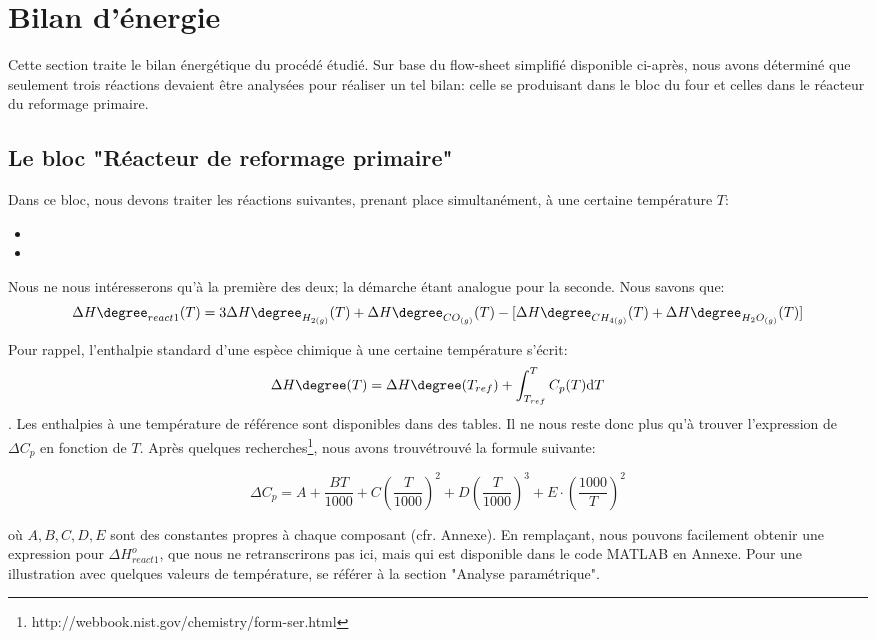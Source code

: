 \documentclass[11pt,a4paper]{report}
\author{Groupe 1246}
\begin{document}
\section*{Bilan d'énergie}

Cette section traite le bilan énergétique du procédé étudié.
Sur base du flow-sheet simplifié disponible ci-après, nous avons déterminé que seulement trois réactions
devaient être analysées pour réaliser un tel bilan: celle se produisant dans le bloc du four et celles dans 
le réacteur du reformage primaire.

\subsection*{Le bloc "Réacteur de reformage primaire"}

Dans ce bloc, nous devons traiter les réactions suivantes, prenant place simultanément, à une certaine température $T$:

\begin{itemize}
\item{}
\item{}
\end{itemize}

\bigbreak
Nous ne nous intéresserons qu'à la première des deux; la démarche étant analogue pour la seconde. Nous savons que:
$$\Delta H\degree_{react1}(T)=3\Delta H\degree_{H_{2(g)}}(T) + \Delta H\degree_{CO_{(g)}}(T) - \lbrack\Delta H\degree_{CH_{4(g)}}(T) + 
\Delta H\degree_{H_{2}O_{(g)}}(T)\rbrack$$

Pour rappel, l'enthalpie standard d'une espèce chimique à une certaine température s'écrit: 
$$\Delta H\degree(T)=\Delta H\degree(T_{ref})  + \displaystyle \int_{T_{ref}}^{T} C_{p}(T) \mathrm{d}T$$. Les enthalpies à
une température de référence sont disponibles dans des tables. Il ne nous reste donc plus qu'à trouver l'expression
de $\Delta C_p$ en fonction de $T$.
Après quelques recherches\footnote{http://webbook.nist.gov/chemistry/form-ser.html}, nous avons trouvétrouvé la formule suivante:

$$\Delta C_p=A+\dfrac{BT}{1000}+C\left(\dfrac{T}{1000}\right)^2+D\left(\dfrac{T}{1000}\right)^3+
E\cdot\left(\dfrac{1000}{T}\right)^2$$

où $A,B,C,D,E$ sont des constantes propres à chaque composant (cfr. Annexe).
En remplaçant, nous pouvons facilement obtenir une expression pour $\Delta H^o_{react1}$, que nous ne retranscrirons pas
ici, mais qui est disponible dans le code \textsc{MATLAB} en Annexe. Pour une illustration avec quelques valeurs de 
température, se référer à la section "Analyse paramétrique".
\end{document}

